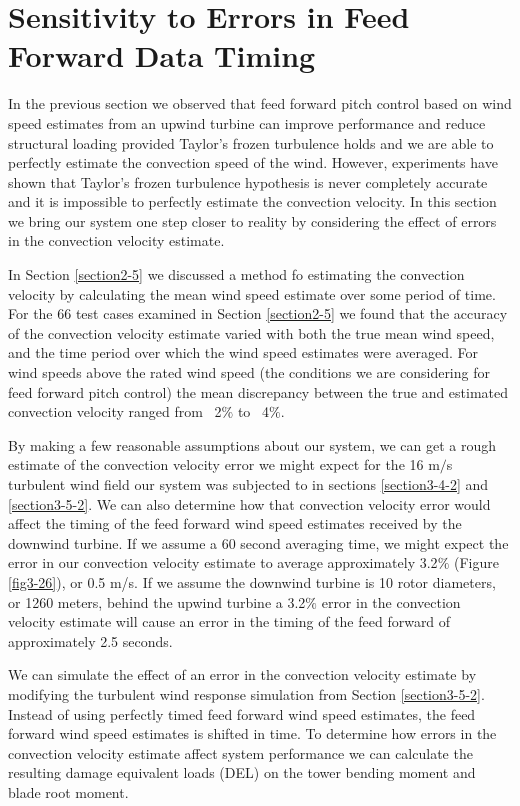 
\section{Sensitivity to Errors in Feed Forward Data Timing}
In the previous section we observed that feed forward pitch control based on wind speed estimates from an upwind turbine can improve performance and reduce structural loading provided Taylor's frozen turbulence holds and we are able to perfectly estimate the convection speed of the wind. However, experiments have shown that Taylor's frozen turbulence hypothesis is never completely accurate and it is impossible to perfectly estimate the convection velocity. In this section we bring our system one step closer to reality by considering the effect of errors in the convection velocity estimate.

In Section \ref{section2-5} we discussed a method fo estimating the convection velocity by calculating the mean wind speed estimate over some period of time. For the 66 test cases examined in Section \ref{section2-5} we found that the accuracy of the convection velocity estimate varied with both the true mean wind speed, and the time period over which the wind speed estimates were averaged. For wind speeds above the rated wind speed (the conditions we are considering for feed forward pitch control) the mean discrepancy between the true and estimated convection velocity ranged from ~2$\%$ to ~4$\%$.

By making a few reasonable assumptions about our system, we can get a rough estimate of the convection velocity error we might expect for the 16 m$/$s turbulent wind field our system was subjected to in sections \ref{section3-4-2} and \ref{section3-5-2}. We can also determine how that convection velocity error would affect the timing of the feed forward wind speed estimates received by the downwind turbine. If we assume a 60 second averaging time, we might expect the error in our convection velocity estimate to average approximately 3.2$\%$ (Figure \ref{fig3-26}), or 0.5 m/s. If we assume the downwind turbine is 10 rotor diameters, or 1260 meters, behind the upwind turbine a 3.2$\%$ error in the convection velocity estimate will cause an error in the timing of the feed forward of approximately 2.5 seconds.

We can simulate the effect of an error in the convection velocity estimate by modifying the turbulent wind response simulation from Section \ref{section3-5-2}. Instead of using perfectly timed feed forward wind speed estimates, the feed forward wind speed estimates is shifted in time. To determine how errors in the convection velocity estimate affect system performance we can calculate the resulting damage equivalent loads (DEL) on the tower bending moment and blade root moment.

